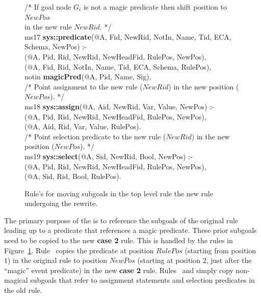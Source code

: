 \begin{figure}[!t]
\ssp
\centering
\begin{boxedminipage}{\linewidth}
/* If goal node $G_i$ is not a magic predicate then shift position to $NewPos$  \\
   in the new rule $NewRid$. */ \\
ms17 {\bf sys::predicate}(@A, Fid, NewRid, NotIn, Name, Tid, ECA, Schema, NewPos) :- \\
(@A, Pid, Rid, NewRid, NewHeadFid, RulePos, NewPos), \\
(@A, Fid, Rid, NotIn, Name, Tid, ECA, Schema, RulePos), \\
\datalogspace notin {\bf magicPred}(@A, Pid, Name, Sig). \\
	
/* Point assignment to the new rule ($NewRid$) in the new position ($NewPos$). */ \\
ms18 {\bf sys::assign}(@A, Aid, NewRid, Var, Value, NewPos) :- \\
(@A, Pid, Rid, NewRid, NewHeadFid, RulePos, NewPos), \\
(@A, Aid, Rid, Var, Value, RulePos). \\
	
/* Point selection predicate to the new rule ($NewRid$) in the new position ($NewPos$). */ \\
ms19 {\bf sys::select}(@A, Sid, NewRid, Bool, NewPos) :- \\
(@A, Pid, Rid, NewRid, NewHeadFid, RulePos, NewPos), \\
(@A, Sid, Rid, Bool, RulePos).

\end{boxedminipage}
\caption{\label{ch:magic:fig:rewrite3} Rule's for moving subgoals in the top level rule
the new rule undergoing the rewrite. }
\end{figure}

The primary purpose of the  is to reference the subgoals of the
original rule leading up to a predicate that references a magic predicate.
These prior subgoals need to be copied to the new {\bf case 2} rule.  This is
handled by the rules in Figure~\ref{ch:magic:fig:rewrite3}.  Rule~
copies the predicate at position $RulePos$ (starting from position $1$) in the
original rule to position $NewPos$ (starting at position $2$, just after the
``magic'' event predicate) in the new {\bf case 2} rule.  Rules~ and
 simply copy non-magical subgoals that refer to assignment statements
and selection predicates in the old rule.


